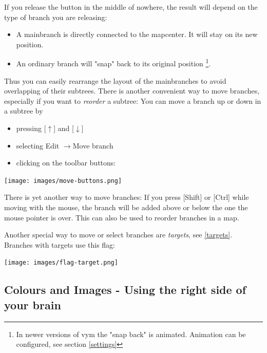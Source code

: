 \documentclass[12pt,a4paper]{article}
\newcommand{\ra}{$\longrightarrow$}
\newcommand{\ua}{$\uparrow$}
\newcommand{\da}{$\downarrow$}
\newcommand{\key}[1]{[#1]}
\begin{document}
If you release the button in the middle of nowhere, the result will
depend on the type of branch you are releasing:
\begin{itemize}
    \item A mainbranch is directly connected to the mapcenter.
        It will stay on its new position.
    \item An ordinary branch will "snap" back to its original position
    \footnote{In newer versions of vym the "snap back" is animated.
    Animation can be configured, see section \ref{settings}}. 
\end{itemize}
Thus you can easily rearrange the layout of the mainbranches to avoid
overlapping of their subtrees.  There is another convenient way to move
branches, especially if you want to {\em reorder} a subtree: You can
move a branch up or down in a subtree by
\begin{itemize}
    \item pressing \key{\ua} and \key {\da}
    \item selecting Edit \ra Move branch
    \item clicking on the toolbar buttons:
\end{itemize}
        \begin{center}
            \texttt{[image: images/move-buttons.png]}
        \end{center}    
There is yet another way to move branches: If you press \key{Shift} or
\key{Ctrl} while moving with the mouse, the branch will be added above
or below the one the mouse pointer is over. This can also be used to
reorder branches in a map.

Another special way to move or select branches are {\em targets}, see
\ref{targets}. Branches with targets use this flag:
\begin{center}
    \texttt{[image: images/flag-target.png]}
    \label{propwindow}
\end{center}


\subsection{Colours and Images - Using the right side of your brain}
\end{document}
